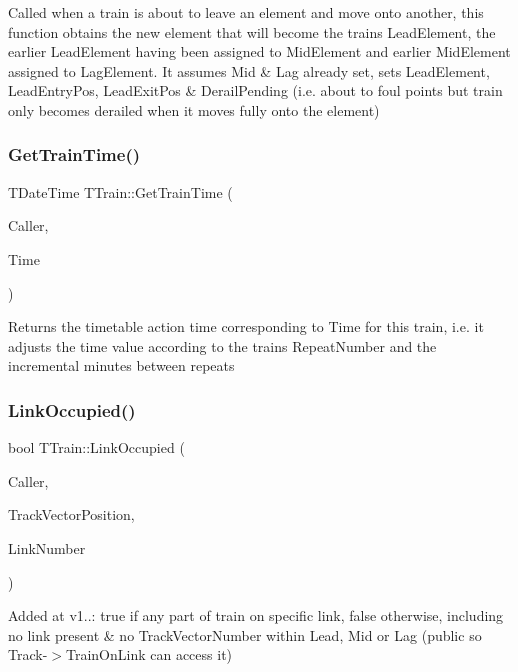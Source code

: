 Called when a train is about to leave an element and move onto another, this function obtains the new element that will become the train\textquotesingle{}s Lead\+Element, the earlier Lead\+Element having been assigned to Mid\+Element and earlier Mid\+Element assigned to Lag\+Element. It assumes Mid \& Lag already set, sets Lead\+Element, Lead\+Entry\+Pos, Lead\+Exit\+Pos \& Derail\+Pending (i.\+e. about to foul points but train only becomes derailed when it moves fully onto the element) \mbox{\label{class_t_train_ad249f34f6862e604b8e141d1b25fe57d}} 
\subsubsection{\texorpdfstring{Get\+Train\+Time()}{GetTrainTime()}}
{\footnotesize\ttfamily T\+Date\+Time T\+Train\+::\+Get\+Train\+Time (\begin{DoxyParamCaption}\item[{int}]{Caller,  }\item[{T\+Date\+Time}]{Time }\end{DoxyParamCaption})\hspace{0.3cm}{\ttfamily [private]}}

Returns the timetable action time corresponding to \textquotesingle{}Time\textquotesingle{} for this train, i.\+e. it adjusts the time value according to the train\textquotesingle{}s Repeat\+Number and the incremental minutes between repeats \mbox{\label{class_t_train_aef32cd9a007874ab09ceeac907e7c88b}} 
\subsubsection{\texorpdfstring{Link\+Occupied()}{LinkOccupied()}}
{\footnotesize\ttfamily bool T\+Train\+::\+Link\+Occupied (\begin{DoxyParamCaption}\item[{int}]{Caller,  }\item[{int}]{Track\+Vector\+Position,  }\item[{int}]{Link\+Number }\end{DoxyParamCaption})}

Added at v1..\+: true if any part of train on specific link, false otherwise, including no link present \& no Track\+Vector\+Number within Lead, Mid or Lag (public so Track-\/$>$Train\+On\+Link can access it) \mbox{\label{class_t_train_a493ab1c185d29bf28ec8fded2356e9fc}} 
